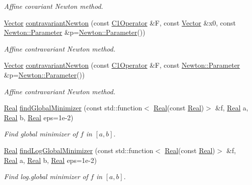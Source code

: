 \begin{DoxyCompactItemize}
\begin{DoxyCompactList}\small\item\em \-Affine covariant \-Newton method. \end{DoxyCompactList}\item 
\hyperlink{classSpacy_1_1Vector}{\-Vector} \hyperlink{group__NewtonGroup_gaa32f667c573986b2b2721ec6532fc832}{contravariant\-Newton} (const \hyperlink{classSpacy_1_1C1Operator}{\-C1\-Operator} \&\-F, const \hyperlink{classSpacy_1_1Vector}{\-Vector} \&x0, const \hyperlink{structSpacy_1_1Newton_1_1Parameter}{\-Newton\-::\-Parameter} \&p=\hyperlink{structSpacy_1_1Newton_1_1Parameter}{\-Newton\-::\-Parameter}())
\begin{DoxyCompactList}\small\item\em \-Affine contravariant \-Newton method. \end{DoxyCompactList}\item 
\hyperlink{classSpacy_1_1Vector}{\-Vector} \hyperlink{group__NewtonGroup_gace045630c7f0c7a1a5a48d2d0807f608}{contravariant\-Newton} (const \hyperlink{classSpacy_1_1C1Operator}{\-C1\-Operator} \&\-F, const \hyperlink{structSpacy_1_1Newton_1_1Parameter}{\-Newton\-::\-Parameter} \&p=\hyperlink{structSpacy_1_1Newton_1_1Parameter}{\-Newton\-::\-Parameter}())
\begin{DoxyCompactList}\small\item\em \-Affine contravariant \-Newton method. \end{DoxyCompactList}\item 
\hyperlink{classSpacy_1_1Real}{\-Real} \hyperlink{namespaceSpacy_ae9be0a4a666a16ff296b87454f36956f}{find\-Global\-Minimizer} (const std\-::function$<$ \hyperlink{classSpacy_1_1Real}{\-Real}(const \hyperlink{classSpacy_1_1Real}{\-Real})$>$ \&f, \hyperlink{classSpacy_1_1Real}{\-Real} a, \hyperlink{classSpacy_1_1Real}{\-Real} b, \hyperlink{classSpacy_1_1Real}{\-Real} eps=1e-\/2)
\begin{DoxyCompactList}\small\item\em \-Find global minimizer of $f$ in $[a,b]$. \end{DoxyCompactList}\item 
\hyperlink{classSpacy_1_1Real}{\-Real} \hyperlink{namespaceSpacy_a7ab93c587f9cb9951b26a8f07209c4cf}{find\-Log\-Global\-Minimizer} (const std\-::function$<$ \hyperlink{classSpacy_1_1Real}{\-Real}(const \hyperlink{classSpacy_1_1Real}{\-Real})$>$ \&f, \hyperlink{classSpacy_1_1Real}{\-Real} a, \hyperlink{classSpacy_1_1Real}{\-Real} b, \hyperlink{classSpacy_1_1Real}{\-Real} eps=1e-\/2)
\begin{DoxyCompactList}\small\item\em \-Find log.\-global minimizer of $f$ in $[a,b]$. \end{DoxyCompactList}\item 

\end{DoxyCompactItemize}

